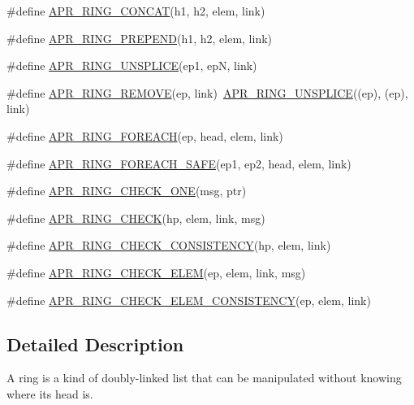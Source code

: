 \begin{DoxyCompactItemize}
\item 
\#define \mbox{\hyperlink{group__apr__ring_ga34ee7a0d6daa61117006bb74498ff5aa}{A\+P\+R\+\_\+\+R\+I\+N\+G\+\_\+\+C\+O\+N\+C\+AT}}(h1,  h2,  elem,  link)
\item 
\#define \mbox{\hyperlink{group__apr__ring_ga4d5aaa9b6f02f96f98f234a0a428474d}{A\+P\+R\+\_\+\+R\+I\+N\+G\+\_\+\+P\+R\+E\+P\+E\+ND}}(h1,  h2,  elem,  link)
\item 
\#define \mbox{\hyperlink{group__apr__ring_ga1d725b0a9ea7ff88f771e37ec130c13b}{A\+P\+R\+\_\+\+R\+I\+N\+G\+\_\+\+U\+N\+S\+P\+L\+I\+CE}}(ep1,  epN,  link)
\item 
\#define \mbox{\hyperlink{group__apr__ring_gaab4a57544bdb660ec1e306137387d9d7}{A\+P\+R\+\_\+\+R\+I\+N\+G\+\_\+\+R\+E\+M\+O\+VE}}(ep,  link)~\mbox{\hyperlink{group__apr__ring_ga1d725b0a9ea7ff88f771e37ec130c13b}{A\+P\+R\+\_\+\+R\+I\+N\+G\+\_\+\+U\+N\+S\+P\+L\+I\+CE}}((ep), (ep), link)
\item 
\#define \mbox{\hyperlink{group__apr__ring_ga7dc7b26e72f836d27e8e0c87da14fb4a}{A\+P\+R\+\_\+\+R\+I\+N\+G\+\_\+\+F\+O\+R\+E\+A\+CH}}(ep,  head,  elem,  link)
\item 
\#define \mbox{\hyperlink{group__apr__ring_ga9a1e91eef86d676d1622dc5b9ddd6f89}{A\+P\+R\+\_\+\+R\+I\+N\+G\+\_\+\+F\+O\+R\+E\+A\+C\+H\+\_\+\+S\+A\+FE}}(ep1,  ep2,  head,  elem,  link)
\item 
\#define \mbox{\hyperlink{group__apr__ring_ga33c7cfbea7c688c7bd0a3d36609f318b}{A\+P\+R\+\_\+\+R\+I\+N\+G\+\_\+\+C\+H\+E\+C\+K\+\_\+\+O\+NE}}(msg,  ptr)
\item 
\#define \mbox{\hyperlink{group__apr__ring_ga97bb4dcc313145496e6b05855f9c6e2b}{A\+P\+R\+\_\+\+R\+I\+N\+G\+\_\+\+C\+H\+E\+CK}}(hp,  elem,  link,  msg)
\item 
\#define \mbox{\hyperlink{group__apr__ring_ga6b0f2091527ee9c7a1511cb6f172a0a7}{A\+P\+R\+\_\+\+R\+I\+N\+G\+\_\+\+C\+H\+E\+C\+K\+\_\+\+C\+O\+N\+S\+I\+S\+T\+E\+N\+CY}}(hp,  elem,  link)
\item 
\#define \mbox{\hyperlink{group__apr__ring_ga5500df0e96dea1a3258f1e92b28fea0a}{A\+P\+R\+\_\+\+R\+I\+N\+G\+\_\+\+C\+H\+E\+C\+K\+\_\+\+E\+L\+EM}}(ep,  elem,  link,  msg)
\item 
\#define \mbox{\hyperlink{group__apr__ring_gab7070ae5cf69bf16178a0e0e397c5b38}{A\+P\+R\+\_\+\+R\+I\+N\+G\+\_\+\+C\+H\+E\+C\+K\+\_\+\+E\+L\+E\+M\+\_\+\+C\+O\+N\+S\+I\+S\+T\+E\+N\+CY}}(ep,  elem,  link)
\end{DoxyCompactItemize}


\subsection{Detailed Description}
A ring is a kind of doubly-\/linked list that can be manipulated without knowing where its head is. 

